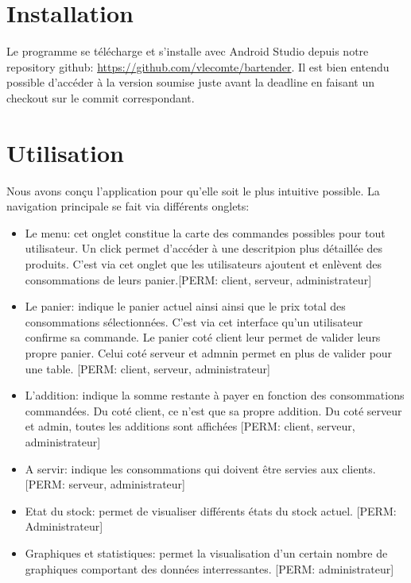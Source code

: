 \documentclass[a4paper,10pt]{article}
\begin{document}

\section{Installation}

Le programme se télécharge et s'installe avec Android Studio depuis notre repository github:
\url{https://github.com/vlecomte/bartender}.
Il est bien entendu possible d'accéder à la version soumise juste avant la deadline en faisant un checkout sur le commit correspondant.

\section{Utilisation}

Nous avons conçu l'application pour qu'elle soit le plus intuitive possible. La navigation principale se fait via différents onglets:
\begin{itemize}
    \item{Le menu: cet onglet constitue la carte des commandes possibles pour tout utilisateur. Un click permet d'accéder à une descritpion plus détaillée des produits. C'est via cet onglet que les utilisateurs ajoutent et enlèvent des consommations de leurs panier.[PERM: client, serveur, administrateur]}
    	\item{Le panier: indique le panier actuel ainsi ainsi que le prix total des consommations sélectionnées. C'est via cet interface qu'un utilisateur confirme sa commande. Le panier coté client leur permet de valider leurs propre panier. Celui coté serveur et admnin permet en plus de valider pour une table. [PERM: client, serveur, administrateur]}
    	\item{L'addition: indique la somme restante à payer en fonction des consommations commandées. Du coté client, ce n'est que sa propre addition. Du coté serveur et admin, toutes les additions sont affichées [PERM: client, serveur, administrateur]}
    	\item{A servir: indique les consommations qui doivent être servies aux clients. [PERM: serveur, administrateur]}
    	\item{Etat du stock: permet de visualiser différents états du stock actuel. [PERM: Administrateur]}
    	\item{Graphiques et statistiques: permet la visualisation d'un certain nombre de graphiques comportant des données interressantes. [PERM: administrateur]}
    	
\end{itemize}
\end{document}
